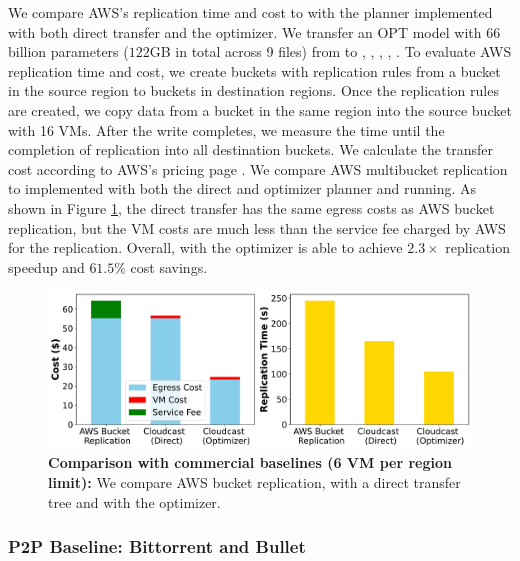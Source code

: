 We compare AWS's replication time and cost to \sys{} with the planner implemented with both direct transfer and the optimizer. 
We transfer an OPT model\cite{zhang2022opt} with 66 billion parameters ($122$GB in total across 9 files) from  to , , , , . To evaluate AWS replication time and cost, we create buckets with replication rules from a bucket in the source region to buckets in destination regions. 
Once the replication rules are created, we copy data from a bucket in the same region into the source bucket with 16 VMs. After the write completes, we measure the time until the completion of replication into all destination buckets. We calculate the transfer cost according to AWS's pricing page \cite{aws-data-transfer-cost}. We compare AWS multibucket replication to \sys{} implemented with both the direct and optimizer planner and running.  As shown in Figure \ref{fig:aws_comparison}, the direct transfer has the same egress costs as AWS bucket replication, but the VM costs are much less than the service fee charged by AWS for the replication. Overall, \sys{} with the optimizer is able to achieve $2.3\times$ replication speedup and $61.5\%$ cost savings. 

\begin{figure}[t]
    \centering
    \includegraphics[width=
    \linewidth]{figures/opt_e2e.pdf}
    \caption{\textbf{Comparison with commercial baselines (6 VM per region limit):} We compare AWS bucket replication, \sys{} with a direct transfer tree and \sys{} with the optimizer. } 
    \label{fig:aws_comparison}
\end{figure}

\subsubsection{P2P Baseline: Bittorrent and Bullet}

